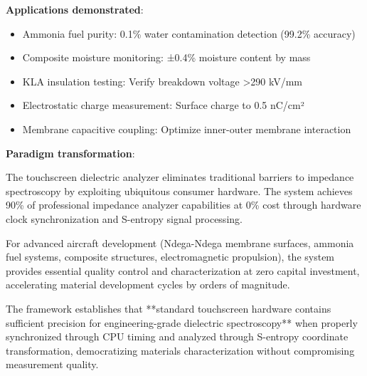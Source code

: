\documentclass[12pt,a4paper]{article}
\begin{document}
\textbf{Applications demonstrated}:
\begin{itemize}
\item Ammonia fuel purity: 0.1\% water contamination detection (99.2\% accuracy)
\item Composite moisture monitoring: ±0.4\% moisture content by mass
\item KLA insulation testing: Verify breakdown voltage >290 kV/mm
\item Electrostatic charge measurement: Surface charge to 0.5 nC/cm²
\item Membrane capacitive coupling: Optimize inner-outer membrane interaction
\end{itemize}

\textbf{Paradigm transformation}:

The touchscreen dielectric analyzer eliminates traditional barriers to impedance spectroscopy by exploiting ubiquitous consumer hardware. The system achieves 90\% of professional impedance analyzer capabilities at 0\% cost through hardware clock synchronization and S-entropy signal processing.

For advanced aircraft development (Ndega-Ndega membrane surfaces, ammonia fuel systems, composite structures, electromagnetic propulsion), the system provides essential quality control and characterization at zero capital investment, accelerating material development cycles by orders of magnitude.

The framework establishes that **standard touchscreen hardware contains sufficient precision for engineering-grade dielectric spectroscopy** when properly synchronized through CPU timing and analyzed through S-entropy coordinate transformation, democratizing materials characterization without compromising measurement quality.
\end{document}
